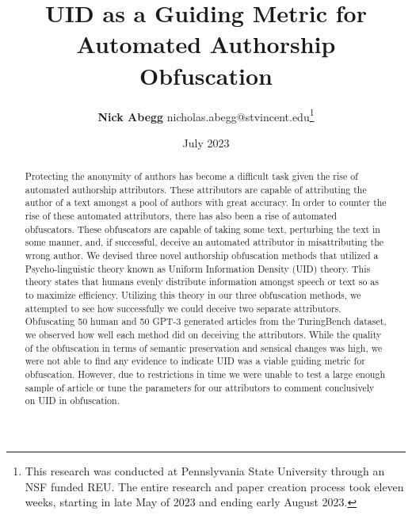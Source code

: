 \documentclass{article}
\title{UID as a Guiding Metric for Automated Authorship Obfuscation}
\author{\textbf{Nick Abegg} nicholas.abegg@stvincent.edu\footnote{This research was conducted at Pennslyvania State University through an NSF funded REU. The entire research and paper creation process took eleven weeks, starting in late May of 2023 and ending early August 2023.}}
\date{July 2023}
\begin{document}
\maketitle

\begin{abstract}
Protecting the anonymity of authors has become a difficult task given the rise of automated authorship attributors. These attributors are capable of attributing the author of a text amongst a pool of authors with great accuracy. In order to counter the rise of these automated attributors, there has also been a rise of automated obfuscators. These obfuscators are capable of taking some text, perturbing the text in some manner, and, if successful, deceive an automated attributor in misattributing the wrong author. We devised three novel authorship obfuscation methods that utilized a Psycho-linguistic theory known as Uniform Information Density (UID) theory. This theory states that humans evenly distribute information amongst speech or text so as to maximize efficiency. Utilizing this theory in our three obfuscation methods, we attempted to see how successfully we could deceive two separate attributors. Obfuscating 50 human and 50 GPT-3 generated articles from the TuringBench dataset, we observed how well each method did on deceiving the attributors. While the quality of the obfuscation in terms of semantic preservation and sensical changes was high, we were not able to find any evidence to indicate UID was a viable guiding metric for obfuscation. However, due to restrictions in time we were unable to test a large enough sample of article or tune the parameters for our attributors to comment conclusively on UID in obfuscation.
\end{abstract}
\end{document}
